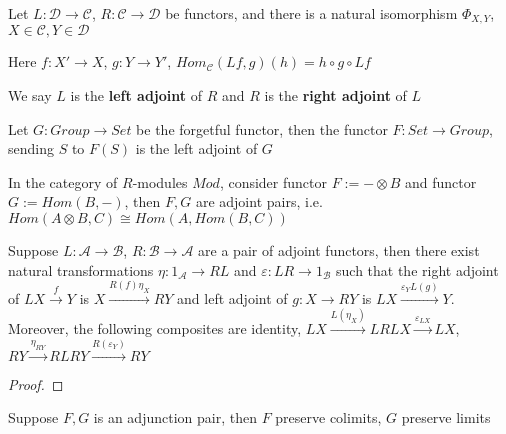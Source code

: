 \documentclass[../main.tex]{subfiles}
\begin{document}
\begin{definition}
Let $L:\mathscr D\to\mathscr C$, $R:\mathscr C\to\mathscr D$ be functors, and there is a natural isomorphism $\Phi_{X,Y}$, $X\in\mathscr C,Y\in\mathscr D$
\begin{center}
\end{center}
Here $f:X'\to X$, $g:Y\to Y'$, $Hom_{\mathscr C}(Lf,g)(h)=h\circ g\circ Lf$ \par
We say $L$ is the \textbf{left adjoint} of $R$ and $R$ is the \textbf{right adjoint} of $L$
\end{definition}

\begin{example}
Let $G:Group\to Set$ be the forgetful functor, then the functor $F:Set\to Group$, sending $S$ to $F(S)$ is the left adjoint of $G$ \par
In the category of $R$-modules $Mod$, consider functor $F:=-\otimes B$ and functor $G:=Hom(B,-)$, then $F,G$ are adjoint pairs, i.e. $Hom(A\otimes B,C)\cong Hom(A,Hom(B,C))$
\end{example}

\begin{theorem}
Suppose $L:\mathscr A\to \mathscr B$, $R:\mathscr B\to \mathscr A$ are a pair of adjoint functors, then there exist natural transformations $\eta:1_{\mathscr A}\to RL$ and $\varepsilon:LR\to 1_{\mathscr B}$ such that the right adjoint of $LX\xrightarrow{f}Y$ is $X\xrightarrow{R(f)\eta_X}RY$ and left adjoint of $g:X\to RY$ is $LX\xrightarrow{\varepsilon_YL(g)}Y$. Moreover, the following composites are identity, $LX\xrightarrow{L(\eta_X)}LRLX\xrightarrow{\varepsilon_{LX}}LX$, $RY\xrightarrow{\eta_{RY}}RLRY\xrightarrow{R(\varepsilon_Y)}RY$
\end{theorem}

\begin{proof}

\end{proof}

\begin{theorem}
Suppose $F,G$ is an adjunction pair, then $F$ preserve colimits, $G$ preserve limits
\end{theorem}
\end{document}

